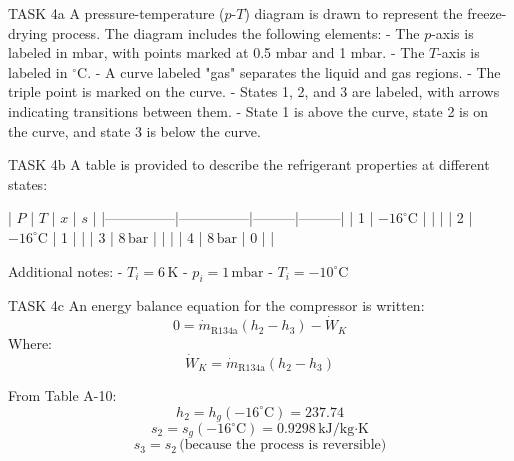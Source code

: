 TASK 4a  
A pressure-temperature (\( p \)-\( T \)) diagram is drawn to represent the freeze-drying process. The diagram includes the following elements:  
- The \( p \)-axis is labeled in mbar, with points marked at 0.5 mbar and 1 mbar.  
- The \( T \)-axis is labeled in \( ^\circ \text{C} \).  
- A curve labeled "gas" separates the liquid and gas regions.  
- The triple point is marked on the curve.  
- States 1, 2, and 3 are labeled, with arrows indicating transitions between them.  
- State 1 is above the curve, state 2 is on the curve, and state 3 is below the curve.  

TASK 4b  
A table is provided to describe the refrigerant properties at different states:  

| \( P \)       | \( T \)       | \( x \) | \( s \) |  
|---------------|---------------|---------|---------|  
| 1             | \(-16^\circ \text{C}\) |         |         |  
| 2             | \(-16^\circ \text{C}\) | 1       |         |  
| 3             | \( 8 \, \text{bar} \)  |         |         |  
| 4             | \( 8 \, \text{bar} \)  | 0       |         |  

Additional notes:  
- \( T_i = 6 \, \text{K} \)  
- \( p_i = 1 \, \text{mbar} \)  
- \( T_i = -10^\circ \text{C} \)  

TASK 4c  
An energy balance equation for the compressor is written:  
\[
0 = \dot{m}_{\text{R134a}} \left( h_2 - h_3 \right) - \dot{W}_K
\]  
Where:  
\[
\dot{W}_K = \dot{m}_{\text{R134a}} \left( h_2 - h_3 \right)
\]  

From Table A-10:  
\[
h_2 = h_g(-16^\circ \text{C}) = 237.74  
\]  
\[
s_2 = s_g(-16^\circ \text{C}) = 0.9298 \, \text{kJ/kg·K}  
\]  
\[
s_3 = s_2 \, \text{(because the process is reversible)}  
\]
